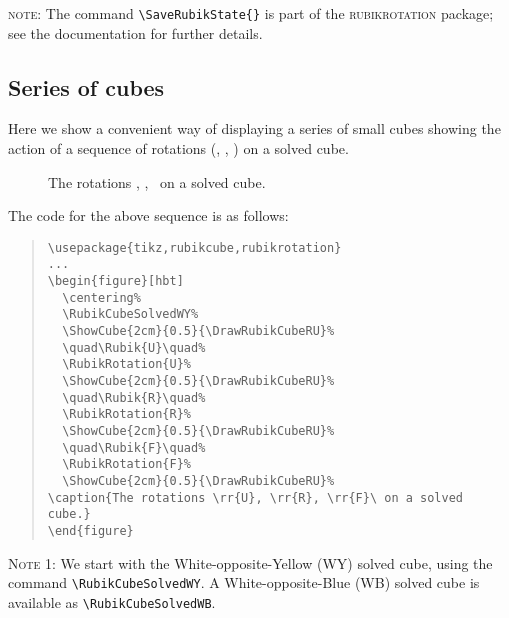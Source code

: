 \documentclass[a4paper]{article}
\begin{document}
\noindent\textsc{note}: The command \verb!\SaveRubikState{}! is part of the 
\textsc{rubikrotation} package; see the documentation for further details.


\pagebreak

\subsection{Series of cubes}

Here we show a convenient way of displaying a series of small cubes showing 
the action of a sequence of rotations (, , ) on a solved cube. 

\begin{figure}[hbt]
\centering
\RubikCubeSolvedWY%
%
\quad{}\quad%
%
%
\quad{}\quad%
%
%
\quad{}\quad%
%
%
\caption{The rotations , , \ on a solved cube.} 
\end{figure}

{\noindent}The code for the above sequence is as follows:
\begin{quote}
\begin{verbatim}
\usepackage{tikz,rubikcube,rubikrotation}
...
\begin{figure}[hbt]
  \centering%
  \RubikCubeSolvedWY%
  \ShowCube{2cm}{0.5}{\DrawRubikCubeRU}%
  \quad\Rubik{U}\quad%
  \RubikRotation{U}%
  \ShowCube{2cm}{0.5}{\DrawRubikCubeRU}% 
  \quad\Rubik{R}\quad%
  \RubikRotation{R}%
  \ShowCube{2cm}{0.5}{\DrawRubikCubeRU}%
  \quad\Rubik{F}\quad%
  \RubikRotation{F}%
  \ShowCube{2cm}{0.5}{\DrawRubikCubeRU}%
\caption{The rotations \rr{U}, \rr{R}, \rr{F}\ on a solved cube.} 
\end{figure}
\end{verbatim}
\end{quote}

{\noindent}\textsc{Note} 1:  We start with the  White-opposite-Yellow (WY) 
solved cube, using the command  \verb!\RubikCubeSolvedWY!.
A White-opposite-Blue (WB) solved cube is available as \verb!\RubikCubeSolvedWB!.

\medskip
\end{document}
